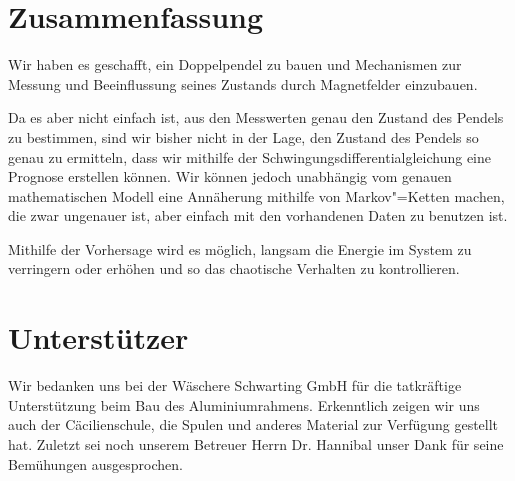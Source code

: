 \documentclass[a4paper, 10pt]{article}
\begin{document}




\newpage
\section{Zusammenfassung}
Wir haben es geschafft, ein Doppelpendel zu bauen und Mechanismen zur Messung und Beeinflussung seines
Zustands durch Magnetfelder einzubauen.

Da es aber nicht einfach ist, aus den Messwerten genau den
Zustand des Pendels zu bestimmen, sind wir bisher nicht in der Lage, den Zustand des Pendels so genau
zu ermitteln, dass wir mithilfe der Schwingungsdifferentialgleichung eine Prognose erstellen können. Wir
können jedoch unabhängig vom genauen mathematischen Modell eine Annäherung mithilfe von Markov"=Ketten machen, die zwar ungenauer ist, aber einfach mit den vorhandenen Daten zu benutzen ist.

Mithilfe der Vorhersage wird es möglich, langsam die Energie im System zu verringern oder erhöhen und so das chaotische Verhalten zu kontrollieren.

\section*{Unterstützer}

Wir bedanken uns bei der Wäschere Schwarting GmbH für die tatkräftige Unterstützung beim Bau des Aluminiumrahmens.
Erkenntlich zeigen wir uns auch der Cäcilienschule, die Spulen und anderes Material zur Verfügung gestellt hat.
Zuletzt sei noch unserem Betreuer Herrn Dr. Hannibal unser Dank für seine Bemühungen ausgesprochen.
\end{document}
